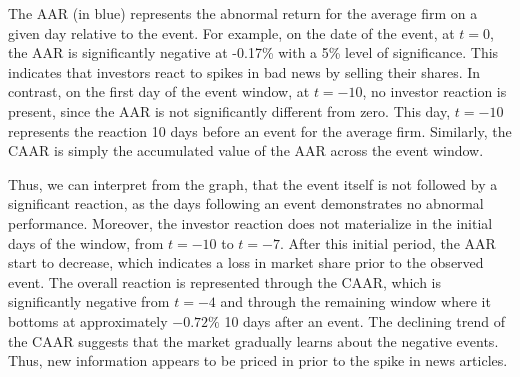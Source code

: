 The AAR (in blue) represents the abnormal return for the average firm on a given day relative to the event. For example, on the date of the event, at $t=0$, the AAR is significantly negative at -0.17\% with a 5\% level of significance. This indicates that investors react to spikes in bad news by selling their shares. In contrast, on the first day of the event window, at $t=-10$, no investor reaction is present, since the AAR is not significantly different from zero. This day, $t=-10$ represents the reaction 10 days before an event for the average firm. Similarly, the CAAR is simply the accumulated value of the AAR across the event window. 

Thus, we can interpret from the graph, that the event itself is not followed by a significant reaction, as the days following an event demonstrates no abnormal performance. Moreover, the investor reaction does not materialize in the initial days of the window, from $t = -10$ to $t = -7$. After this initial period, the AAR start to decrease, which indicates a loss in market share prior to the observed event. The overall reaction is represented through the CAAR, which is significantly negative from $t=-4$ and through the remaining window where it bottoms at approximately $-0.72\%$ 10 days after an event. The declining trend of the CAAR suggests that the market gradually learns about the negative events. Thus, new information appears to be priced in prior to the spike in news articles.


